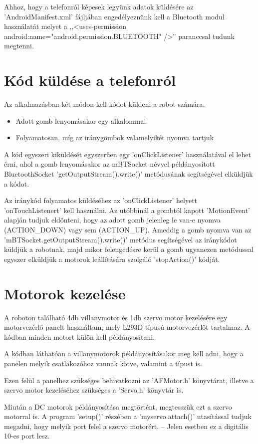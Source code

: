 \documentclass[]{thesis-ekf}
\theoremstyle{definition}
\begin{document}
Ahhoz, hogy a telefonról képesek legyünk adatok küldésére az 'AndroidManifest.xml' fájljában engedélyeznünk kell a Bluetooth modul használatát melyet a ,,<uses-permission android:name="android.permission.BLUETOOTH" />'' paranccsal tudunk megtenni.
\section{Kód küldése a telefonról}
Az alkalmazásban két módon kell kódot küldeni a robot számára.
\begin{itemize}
	\item Adott gomb lenyomásakor egy alkalommal
	\item Folyamatosan, míg az iránygombok valamelyikét nyomva tartjuk
\end{itemize}

A kód egyszeri kiküldését egyszerűen egy 'onClickListener' használatával el lehet érni, ahol a gomb lenyomásakor az mBTSocket névvel példányosított BluetoothSocket 'getOutputStream().write()' metódusának segítségével elküldjük a kódot.

Az iránykód folyamatos küldéséhez az 'onClickListener' helyett 'onTouchListenert' kell használni. Az utóbbinál a gombtól kapott 'MotionEvent' alapján tudjuk eldönteni, hogy az adott gomb jelenleg le van-e nyomva (ACTION\_DOWN) vagy sem (ACTION\_UP). Ameddig a gomb nyomva van az 'mBTSocket.getOutputStream().write()' metódus segítségével az iránykódot küldjük a robotnak, majd mikor felengedésre kerül a gomb ugyanezen metódussal egyszer elküldjük a motorok leállítására szolgáló 'stopAction()' kódját.
\section{Motorok kezelése}
A roboton található 4db villanymotor és 1db szervo motor kezelésére egy motorvezérlő panelt használtam, mely L293D típusú motorvezérlőt tartalmaz. A kódban minden motort külön kell példányosítani.


A kódban láthatóan a villanymotorok példányosításakor meg kell adni, hogy a panelen melyik csatlakozóhoz vannak kötve, valamint a típust is.

Ezen felül a panelhez szükséges behivatkozni az 'AFMotor.h' könyvtárat, illetve a szervo motor kezeléséhez szükséges a 'Servo.h' könyvtár is.

Miután a DC motorok példányosítása megtörtént, megtesszük ezt a szervo motorral is. A program 'setup()' részében a 'myservo.attach()' utasítással tudjuk megadni, hogy melyik port felel a szervo motorért. -- Jelen esetben ez a digitális 10-es port lesz.
\end{document}
